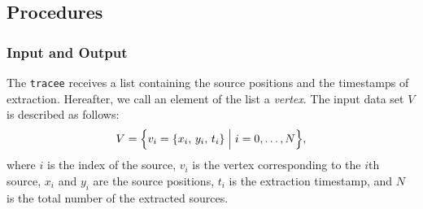 \begin{algorithm}[tp]
  \caption{Overview of \texttt{tracee}}
  \label{algorithm:tracee}
  \DontPrintSemicolon
  \BlankLine
\end{algorithm}


\subsection{Procedures}
\label{sec:algorithm:procedure}

\subsubsection{Input and Output}
\label{sec:algorithm:procedure:input/output}

The \texttt{tracee} receives a list containing the source positions and the timestamps of extraction. Hereafter, we call an element of the list a \textit{vertex}. The input data set $V$ is described as follows:
\begin{equation}
  \label{eq:algo:vertex}
  V = \Bigl\{
    v_i = \left\{ x_i, \, y_i, \, t_i \right\} \Bigm|
    i = 0,\ldots,N
    \Bigr\},
\end{equation}
where $i$ is the index of the source, $v_i$ is the vertex corresponding to the $i$th source, $x_i$ and $y_i$ are the source positions, $t_i$ is the extraction timestamp, and $N$ is the total number of the extracted sources.

